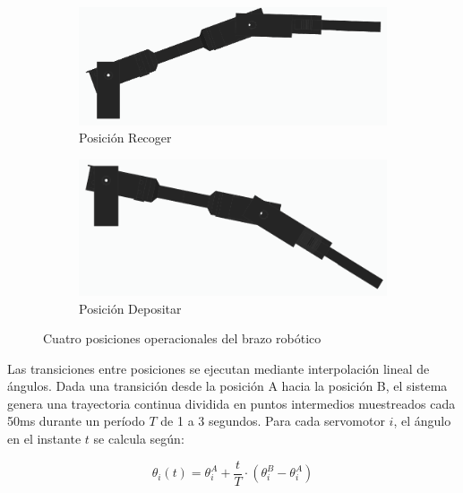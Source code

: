 \begin{figure}[H]
    \vspace{0.25cm}

    \begin{subfigure}[b]{0.45\textwidth}
        \centering
        \includegraphics[width=\textwidth]{imagenes/brazo_recoger.png}
        \caption{Posición Recoger}
    \end{subfigure}
    \hfill
    \begin{subfigure}[b]{0.45\textwidth}
        \centering
        \includegraphics[width=\textwidth]{imagenes/brazo_depositar.png}
        \caption{Posición Depositar}
    \end{subfigure}

    \caption{Cuatro posiciones operacionales del brazo robótico}
    \label{fig:posiciones_brazo}
\end{figure}


Las transiciones entre posiciones se ejecutan mediante interpolación lineal de ángulos. Dada una transición desde la posición A hacia la posición B, el sistema genera una trayectoria continua dividida en puntos intermedios muestreados cada 50ms durante un período $T$ de 1 a 3 segundos. Para cada servomotor $i$, el ángulo en el instante $t$ se calcula según:

\begin{equation}
\theta_i(t) = \theta_i^A + \frac{t}{T} \cdot (\theta_i^B - \theta_i^A)
\end{equation}

